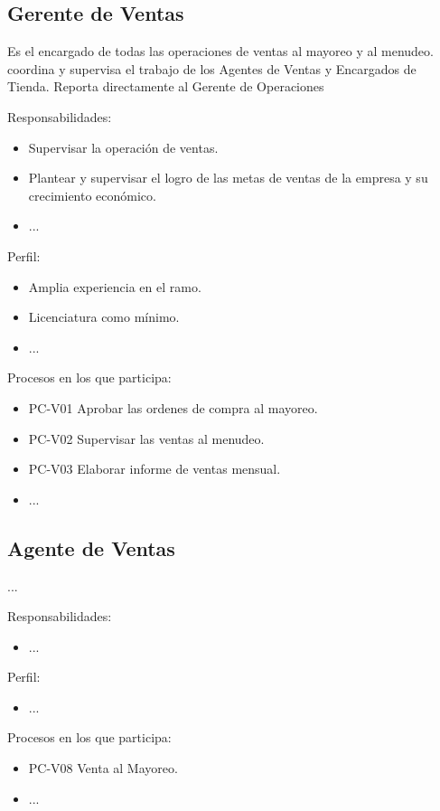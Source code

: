 \begin{Usuario}{\subsection{Gerente de Ventas}}{
	Es el encargado de todas las operaciones de ventas al mayoreo y al menudeo. coordina y supervisa el trabajo de los Agentes de Ventas y Encargados de Tienda.
	Reporta directamente al Gerente de Operaciones
}
    \item[Responsabilidades:] \cdtEmpty
    \begin{itemize}
		\item Supervisar la operación de ventas.
		\item Plantear y supervisar el logro de las metas de ventas de la empresa y su crecimiento económico.
		\item ...
    \end{itemize}

	\item[Perfil:] \cdtEmpty
    \begin{itemize}
		\item Amplia experiencia en el ramo.
		\item Licenciatura como mínimo.
		\item ...
    \end{itemize}
	\item[Procesos en los que participa:] \cdtEmpty
    \begin{itemize}
		\item PC-V01 Aprobar las ordenes de compra al mayoreo.
		\item PC-V02 Supervisar las ventas al menudeo.
		\item PC-V03 Elaborar informe de ventas mensual.
		\item ...
    \end{itemize}
\end{Usuario}

\begin{Usuario}{\subsection{Agente de Ventas}}{
	...
}
    \item[Responsabilidades:] \cdtEmpty
    \begin{itemize}
		\item ...
    \end{itemize}

	\item[Perfil:] \cdtEmpty
    \begin{itemize}
		\item ...
    \end{itemize}
	\item[Procesos en los que participa:] \cdtEmpty
    \begin{itemize}
		\item PC-V08 Venta al Mayoreo.
		\item ...
    \end{itemize}
\end{Usuario}



